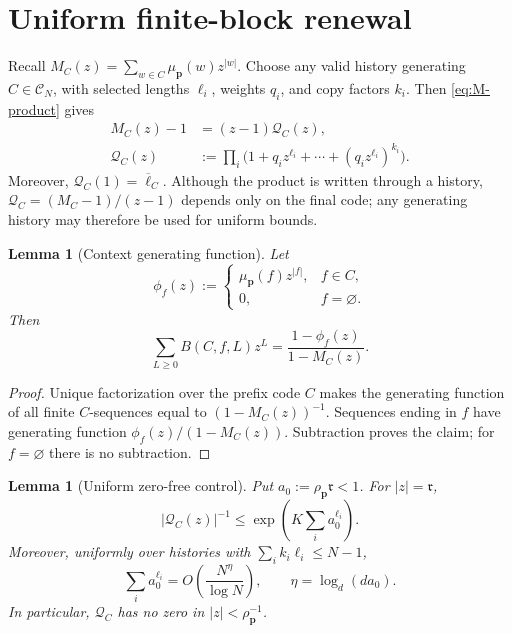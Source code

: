 \documentclass[journal]{IEEEtran}
\theoremstyle{plain}
\newtheorem{lemma}[theorem]{Lemma}
\theoremstyle{definition}
\theoremstyle{remark}
\newcommand{\muP}{\mu_{\mathbf p}}
\newcommand{\rhoP}{\rho_{\mathbf p}}
\newcommand{\lbar}{\overline\ell}
\begin{document}
\section{Uniform finite-block renewal}\label{app:renewal}

Recall $M_C(z)=\sum_{w\in C}\muP(w)z^{|w|}$.  Choose any valid history generating $C\in\mathcal C_N$, with selected lengths $\ell_i$, weights $q_i$, and copy factors $k_i$.  Then \eqref{eq:M-product} gives
\begin{equation}\label{eq:code-factor}
\begin{aligned}
 M_C(z)-1&=(z-1)\mathcal Q_C(z),\\
 \mathcal Q_C(z)&:=\prod_i
 \bigl(1+q_iz^{\ell_i}+\cdots+(q_iz^{\ell_i})^{k_i}\bigr).
\end{aligned}
\end{equation}
Moreover, $\mathcal Q_C(1)=\lbar_C$.  Although the product is written through a history, $\mathcal Q_C=(M_C-1)/(z-1)$ depends only on the final code; any generating history may therefore be used for uniform bounds.

\begin{lemma}[Context generating function]\label{lem:context-gf-new}
Let
\begin{equation*}
 \phi_f(z):=
 \begin{cases}
  \muP(f)z^{|f|},&f\in C,\\
  0,&f=\varnothing.
 \end{cases}
\end{equation*}
Then
\begin{equation}\label{eq:context-gf-new}
 \sum_{L\ge0}B(C,f,L)z^L
 =\frac{1-\phi_f(z)}{1-M_C(z)}.
\end{equation}
\end{lemma}

\begin{proof}
Unique factorization over the prefix code $C$ makes the generating function of all finite $C$-sequences equal to $(1-M_C(z))^{-1}$.  Sequences ending in $f$ have generating function $\phi_f(z)/(1-M_C(z))$.  Subtraction proves the claim; for $f=\varnothing$ there is no subtraction.
\end{proof}

\begin{lemma}[Uniform zero-free control]\label{lem:zero-free-new}
Put $a_0:=\rhoP\mathfrak r<1$.  For $|z|=\mathfrak r$,
\begin{equation}\label{eq:Q-inverse-new}
 |\mathcal Q_C(z)|^{-1}\le
 \exp\left(K\sum_i a_0^{\ell_i}\right).
\end{equation}
Moreover, uniformly over histories with $\sum_i k_i\ell_i\le N-1$,
\begin{equation}\label{eq:a-sum-new}
 \sum_i a_0^{\ell_i}=O\left(\frac{N^\eta}{\log N}\right),
 \qquad
 \eta=\log_d(da_0).
\end{equation}
In particular, $\mathcal Q_C$ has no zero in $|z|<\rhoP^{-1}$.
\end{lemma}
\end{document}
